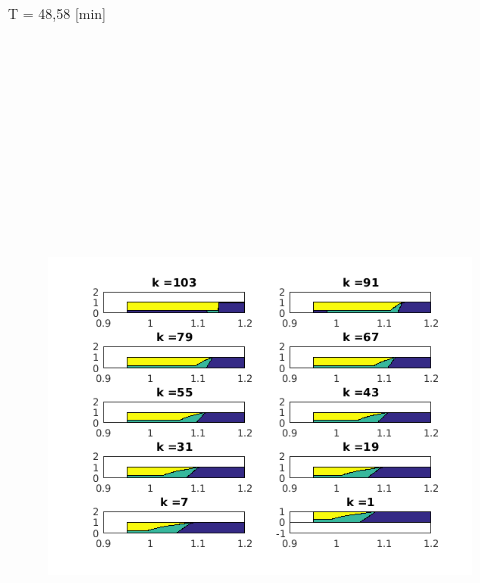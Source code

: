 \documentclass[]{article}
\begin{document}
T = 48,58 [min]
\begin{figure}[H]
	\centering
	\includegraphics[width=18cm,height=20cm,keepaspectratio]{weeklyLong.png}
\end{figure}
\end{document}
